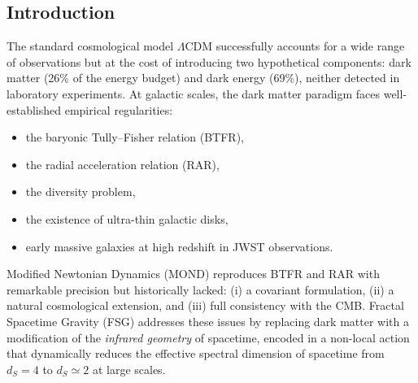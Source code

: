 \documentclass[11pt,a4paper]{article}
\begin{document}
\begin{onehalfspacing}
\begin{abstract}
We are explicit about what remains open: (i) the covariant action for the pillar; (ii) the spatial lensing offset of the Bullet Cluster, which we show is \emph{not} produced by the memory mechanism --- the same wall faced by all modified-gravity approaches --- and remains unsolved; and (iii) the CMB acoustic-peak amplitudes, which require a dedicated non-local Boltzmann code. The CMB peak \emph{geometry} is shown compatible with FSG. This version (6.1) additionally records concrete progress on the central open problem (Section~\ref{sec:aest}): the single-potential structure of the pillar identifies its covariant home as the Aether--Scalar--Tensor (AeST) class, whose free function is fixed by $d_{\rm eff}(g)$ and whose dark sector is carried by the same memory field that fixes $a_0$. These are structural correspondences, not a completed derivation, and the honest boundaries are stated.
\end{abstract}
\newpage
\tableofcontents
\newpage
\section{Introduction}
The standard cosmological model $\Lambda$CDM successfully accounts for a wide
range of observations but at the cost of introducing two hypothetical
components: dark matter (26\% of the energy budget) and dark energy (69\%),
neither detected in laboratory experiments.
At galactic scales, the dark matter paradigm faces well-established empirical
regularities:
\begin{itemize}
    \item the baryonic Tully--Fisher relation (BTFR),
    \item the radial acceleration relation (RAR),
    \item the diversity problem,
    \item the existence of ultra-thin galactic disks,
    \item early massive galaxies at high redshift in JWST observations.
\end{itemize}
Modified Newtonian Dynamics (MOND) reproduces BTFR and RAR with remarkable
precision but historically lacked: (i) a covariant formulation,
(ii) a natural cosmological extension, and (iii) full consistency with the CMB.
Fractal Spacetime Gravity (FSG) addresses these issues by replacing dark matter
with a modification of the \emph{infrared geometry} of spacetime, encoded in a
non-local action that dynamically reduces the effective spectral dimension of
spacetime from $d_S=4$ to $d_S \simeq 2$ at large scales.

\end{onehalfspacing}
\end{document}
